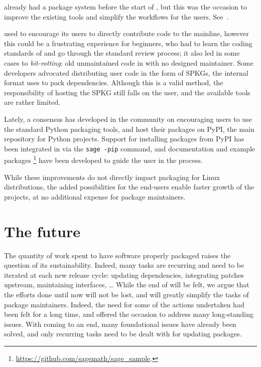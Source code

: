 \documentclass{deliverablereport}
\begin{document}
\begin{description}
  \GAP already had a package system before the start of \ODK, but this
  was the occasion to improve the existing tools and simplify the
  workflows for the users. See~.

  \Sage used to encourage its users to directly contribute code to the
  mainline, however this could be a frustrating experience for
  beginners, who had to learn the coding standards of \Sage and go
  through the standard review process; it also led in some cases to
  \emph{bit-rotting}: old unmaintained code in \Sage with no designed
  maintainer. %
  Some \Sage developers advocated distributing user code in the form
  of SPKGs, the internal format \Sage uses to pack dependencies. %
  Although this is a valid method, the responsibility of hosting the
  SPKG still falls on the user, and the available tools are rather
  limited. %
  
  Lately, a consensus has developed in the community on encouraging
  users to use the standard Python packaging tools, and host their
  packages on PyPI, the main repository for Python projects. %
  Support for installing packages from PyPI has been integrated in
  \Sage via the \texttt{sage -pip} command, and documentation and
  example packages%
  \footnote{\url{https://github.com/sagemath/sage_sample}.}%
  have been developed to guide the user in the process.

  While these improvements do not directly impact packaging for Linux
  distributions, the added possibilities for the end-users enable
  faster growth of the projects, at no additional expense for package
  maintainers.
\end{description}

\section{The future}

The quantity of work spent to have software properly packaged raises
the question of its sustainability. %
Indeed, many tasks are recurring and need to be iterated at each new
release cycle: updating dependencies, integrating patches upstream,
maintaining interfaces, \dots %
While the end of \ODK will be felt, we argue that the efforts done
until now will not be lost, and will greatly simplify the tasks of
package maintainers.  %
Indeed, the need for some of the actions undertaken had been felt for
a long time, and \ODK offered the occasion to address many
long-standing issues. %
With \ODK coming to an end, many foundational issues have already been
solved, and only recurring tasks need to be dealt with for updating
packages.
\end{document}
